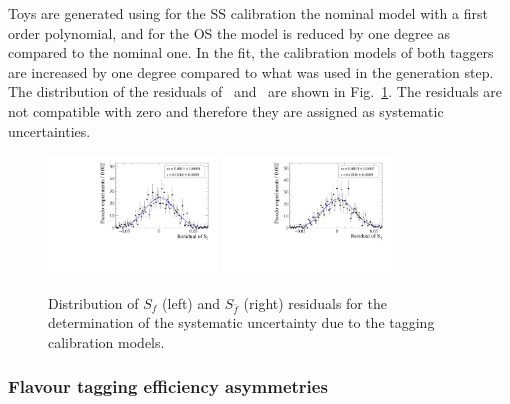 Toys are generated using for the SS calibration the nominal model with a first order polynomial, and
for the OS the model is reduced by one degree as compared to the nominal one. In the fit,
the calibration models of both taggers are increased by one degree compared to what was used in the generation step.
The distribution of the residuals of \Sf~and \Sfb~are shown in Fig.~\ref{fig:FTSystToys}.
The residuals are not compatible with zero and therefore they are assigned as systematic uncertainties.
\begin{figure}[t]
	\begin{center}
		\includegraphics[width=0.4\textwidth]{06Systematics/figs/FT_Sf_res.pdf}
		\includegraphics[width=0.4\textwidth]{06Systematics/figs/FT_Sfbar_res.pdf}
	\end{center}
        \vspace{-2mm}
	\caption{Distribution of $S_f$ (left) and $S_{\bar f}$ (right) residuals for the determination of the systematic uncertainty due to the tagging calibration
	models.}
	\label{fig:FTSystToys}
\end{figure}

\subsubsection{Flavour tagging efficiency asymmetries}
\label{sec:syst_toys_tageffAsym}

